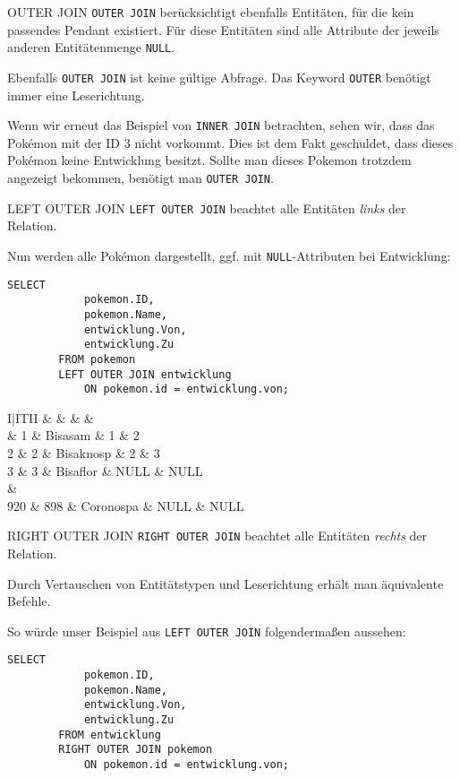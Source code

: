 \begin{defi}{OUTER JOIN}
    \texttt{OUTER JOIN} berücksichtigt ebenfalls Entitäten, für die kein passendes Pendant existiert.
    Für diese Entitäten sind alle Attribute der jeweils anderen Entitätenmenge \texttt{NULL}.

    Ebenfalls \texttt{OUTER JOIN} ist keine gültige Abfrage.
    Das Keyword \texttt{OUTER} benötigt immer eine Leserichtung.

    Wenn wir erneut das Beispiel von \texttt{INNER JOIN} betrachten, sehen wir, dass das Pokémon mit der ID 3 nicht vorkommt.
    Dies ist dem Fakt geschuldet, dass dieses Pokémon keine Entwicklung besitzt.
    Sollte man dieses Pokemon trotzdem angezeigt bekommen, benötigt man \texttt{OUTER JOIN}.
\end{defi}

\begin{sql}{LEFT OUTER JOIN}
    \texttt{LEFT OUTER JOIN} beachtet alle Entitäten \emph{links} der Relation.

    Nun werden alle Pokémon dargestellt, ggf. mit \texttt{NULL}-Attributen bei Entwicklung:

    \begin{lstlisting}[style=SqlInputStyle]
        SELECT
            pokemon.ID,
            pokemon.Name,
            entwicklung.Von,
            entwicklung.Zu
        FROM pokemon
        LEFT OUTER JOIN entwicklung
            ON pokemon.id = entwicklung.von;
    \end{lstlisting}

    \begin{tabular}{I|ITII}
        &  &  &  &  \\ & 1 & Bisasam & 1 & 2 \\
        2 & 2 & Bisaknosp & 2 & 3 \\
        3 & 3 & Bisaflor & NULL & NULL \\
         &  \\
        920 & 898 & Coronospa & NULL & NULL \\
    \end{tabular}
\end{sql}

\begin{sql}{RIGHT OUTER JOIN}
    \texttt{RIGHT OUTER JOIN} beachtet alle Entitäten \emph{rechts} der Relation.

    Durch Vertauschen von Entitätstypen und Leserichtung erhält man äquivalente Befehle.

    So würde unser Beispiel aus \texttt{LEFT OUTER JOIN} folgendermaßen aussehen:

    \begin{lstlisting}[style=SqlInputStyle]
        SELECT
            pokemon.ID,
            pokemon.Name,
            entwicklung.Von,
            entwicklung.Zu
        FROM entwicklung
        RIGHT OUTER JOIN pokemon
            ON pokemon.id = entwicklung.von;
    \end{lstlisting}
\end{sql}

